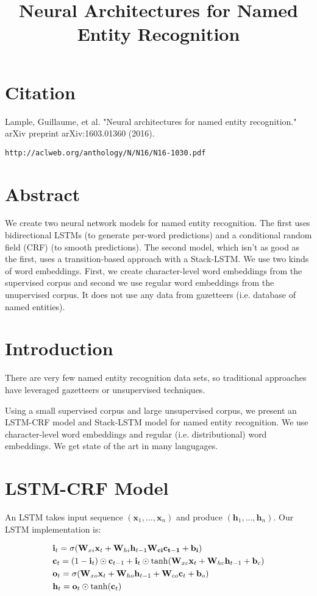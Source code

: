 \documentclass[a4paper]{article}
\title{Neural Architectures for Named Entity Recognition}
\date{}
\begin{document}
\maketitle

\section{Citation}
Lample, Guillaume, et al. "Neural architectures for named entity recognition." arXiv preprint arXiv:1603.01360 (2016).

\begin{verbatim}
http://aclweb.org/anthology/N/N16/N16-1030.pdf
\end{verbatim}

\section{Abstract}
We create two neural network models for named entity recognition. The first
uses bidirectional LSTMs (to generate per-word predictions) and a conditional
random field (CRF) (to smooth predictions). The second model, which isn't
as good as the first, uses a transition-based approach with a Stack-LSTM.
We use two kinds of word embeddings. First, we create character-level word
embeddings from the supervised corpus and second we use regular word
embeddings from the unupervised corpus. It does not use any data from
gazetteers (i.e. database of named entities).

\section{Introduction}
There are very few named entity recognition data sets, so traditional approaches
have leveraged gazetteers or unsupervised techniques.

Using a small supervised corpus and large unsupervised corpus, we present
an LSTM-CRF model and Stack-LSTM model for named entity recognition. We use
character-level word embeddings and regular (i.e. distributional) word
embeddings. We get state of the art in many langugages.

\section{LSTM-CRF Model}
An LSTM takes input sequence $(\mathbf{x}_1, ..., \mathbf{x}_n)$ and produce
$(\mathbf{h}_1, ..., \mathbf{h}_n)$. Our LSTM implementation is:

\begin{align}
  & \mathbf{i}_t = \sigma(\mathbf{W}_{xi} \mathbf{x}_t +
  \mathbf{W}_{hi} \mathbf{h}_{t-1}
  \bf{W}_{ci} c_{t-1} + \mathbf{b}_i) \\
  & \mathbf{c}_t = (1 - \mathbf{i}_t) \odot \mathbf{c}_{t-1} +
  \mathbf{i}_t \odot \tanh(
  \mathbf{W}_{xc} \mathbf{x}_t + \mathbf{W}_{hc} \mathbf{h}_{t-1}
  + \mathbf{b}_c
  ) \\
  & \mathbf{o}_t = \sigma(
    \mathbf{W}_{xo} \mathbf{x}_t +
    \mathbf{W}_{ho} \mathbf{h}_{t-1} +
    \mathbf{W}_{co} \mathbf{c}_t +
    \mathbf{b}_o
  ) \\
  & \mathbf{h}_t = \mathbf{o}_t \odot \tanh(\mathbf{c}_t)
\end{align}
\end{document}
